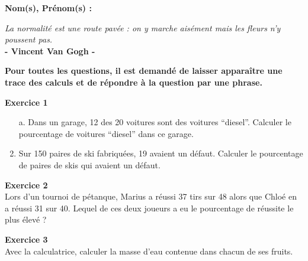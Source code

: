 \documentclass[12pt]{article}
\newcommand{\Pointille}[1][3]{\multido{}{#1}{    \makebox[\linewidth]{\dotfill}\\[\parskip]}}
\begin{document}
\setlength{\columnseprule}{1pt}


\textbf{Nom(s), Prénom(s) :}

\begin{center}
  \textit{La normalité est une route pavée : on y marche aisément mais les fleurs n'y poussent pas.}\\ \textbf{- Vincent Van Gogh -}
\end{center}

\textbf{Pour toutes les questions, il est demandé de laisser apparaître une trace des calculs et de répondre à la question par une phrase.}


\textbf{Exercice 1}

\begin{multicols}{2}

  \begin{enumerate}
  \item[a.] Dans un garage, 12 des 20 voitures sont des voitures ``diesel''. Calculer le pourcentage de voitures ``diesel'' dans ce garage.\\
    \Pointille[5]
  \item Sur 150 paires de ski fabriquées, 19 avaient un défaut. Calculer le pourcentage de paires de skis qui avaient un défaut.\\
    \Pointille[5]
  \end{enumerate}

\end{multicols}


\begin{multicols}{2}

  \textbf{Exercice 2}\\
  Lors d'un tournoi de pétanque, Marius a réussi 37 tirs sur 48 alors que Chloé en a réussi 31 sur 40. Lequel de ces deux joueurs a eu le pourcentage de réussite le plus élevé ?\\ \vspace{0.5cm}
  \Pointille[7]

\end{multicols}

\textbf{Exercice 3}\\
Avec la calculatrice, calculer la masse d'eau contenue dans chacun de ses fruits.
\end{document}
